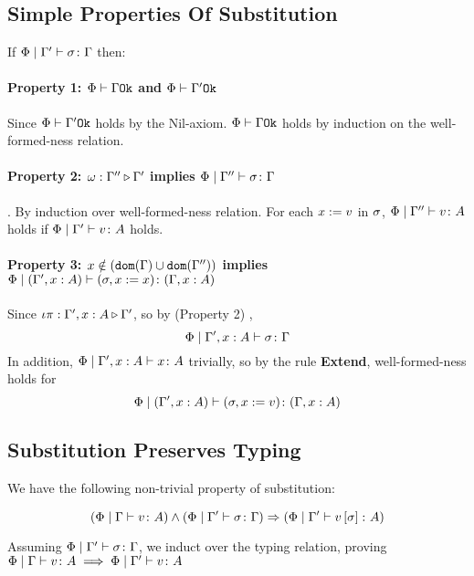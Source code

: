 {\subsection{Simple Properties Of Substitution}
If $\Phi\mid\Gamma' \vdash \sigma \colon \Gamma$ then:

    \paragraph{Property 1: $\Phi\vdash \Gamma \texttt{Ok}$ and $\Phi\vdash \Gamma' \texttt{Ok}$}
     Since $\Phi\vdash \Gamma' \texttt{Ok}$ holds by the Nil-axiom. $\Phi\vdash \Gamma \texttt{Ok}$ holds by induction on the well-formed-ness relation.
    \paragraph{Property 2: $\omega : \Gamma'' \triangleright \Gamma'$ implies $\Phi\mid\Gamma'' \vdash \sigma \colon \Gamma$}. 
    By induction over well-formed-ness relation. For each $x:= v$ in $\sigma$, $\Phi\mid\Gamma'' \vdash v \colon A$ holds if $\Phi\mid\Gamma' \vdash v \colon A$ holds.
    \paragraph{Property 3: $x \notin (\texttt{dom}(\Gamma) \cup \texttt{dom}(\Gamma''))$ implies $\Phi\mid(\Gamma', x: A) \vdash (\sigma, x := x) \colon (\Gamma, x: A)$} 
    Since $\iota\pi : \Gamma',x: A \triangleright \Gamma'$, so by (Property 2) , 
    $$\Phi\mid\Gamma', x: A \vdash \sigma \colon \Gamma$$
    In addition, $\Phi\mid\Gamma', x: A \vdash x \colon A$ trivially, so by the rule \textbf{Extend}, well-formed-ness holds for
    \begin{equation}
        \Phi\mid(\Gamma', x:A) \vdash (\sigma, x:= v) \colon (\Gamma, x: A)
    \end{equation}


\subsection{Substitution Preserves Typing}
We have the following non-trivial property of substitution:

\begin{equation}
    (\Phi\mid\Gamma \vdash v \colon A)\wedge(\Phi\mid\Gamma' \vdash \sigma \colon \Gamma)\Rightarrow(\Phi\mid\Gamma' \vdash v\left[\sigma\right] \colon A)
\end{equation}

Assuming $\Phi\mid\Gamma' \vdash \sigma \colon \Gamma$, we induct over the typing relation, proving $\Phi\mid\Gamma \vdash v \colon A\implies\Phi\mid\Gamma' \vdash v \colon A$

}
